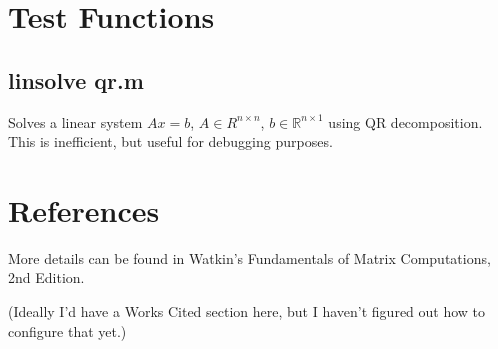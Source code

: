\documentclass{article}
\newcommand{\R}{\mathbb{R}}
\begin{document}
\section*{Test Functions}

\subsection*{linsolve qr.m}

Solves a linear system $Ax = b$, $A \in R^{n \times n}$, $b \in \R^{n \times 1}$ using QR decomposition. This is inefficient, but useful for debugging purposes.


\section*{References}

More details can be found in Watkin's Fundamentals of Matrix Computations, 2nd Edition.

(Ideally I'd have a Works Cited section here, but I haven't figured out how to configure that yet.)
\end{document}
